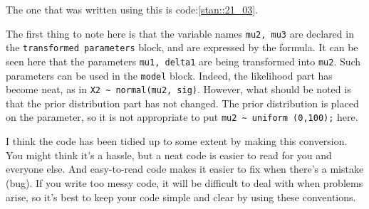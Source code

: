 \documentclass{ltjsbook}
\begin{document}
The one that was written using this is code:\ref{stan::21_03}.

The first thing to note here is that the variable names \verb|mu2, mu3| are declared in the \verb|transformed parameters| block, and are expressed by the formula. It can be seen here that the parameters \verb|mu1, delta1| are being transformed into \verb|mu2|. Such parameters can be used in the \verb|model| block. Indeed, the likelihood part has become neat, as in \verb|X2 ~ normal(mu2, sig)|. However, what should be noted is that the prior distribution part has not changed. The prior distribution is placed on the parameter, so it is not appropriate to put \verb|mu2 ~ uniform (0,100);| here.

I think the code has been tidied up to some extent by making this conversion. You might think it's a hassle, but a neat code is easier to read for you and everyone else. And easy-to-read code makes it easier to fix when there's a mistake (bug). If you write too messy code, it will be difficult to deal with when problems arise, so it's best to keep your code simple and clear by using these conventions.
\end{document}
